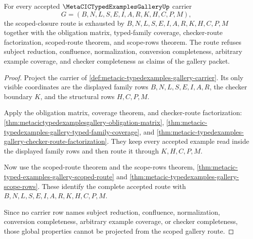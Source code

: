 \begin{theorem}
\label{thm:metacic-typed-examples-gallery-scoped-closure-route}
For every accepted $\MetaCICTypedExamplesGalleryUp$ carrier
$$
G=(B,N,L,S,E,I,A,R,K,H,C,P,M),
$$
the scoped-closure route is exhausted by $B,N,L,S,E,I,A,R,K,H,C,P,M$ together with the obligation matrix, typed-family coverage, checker-route factorization, scoped-route theorem, and scope-rows theorem. The route refuses subject reduction, confluence, normalization, conversion completeness, arbitrary example coverage, and checker completeness as claims of the gallery packet.
\end{theorem}
\begin{proof}
Project the carrier of \autoref{def:metacic-typedexamples-gallery-carrier}. Its only visible coordinates are the displayed family rows $B,N,L,S,E,I,A,R$, the checker boundary $K$, and the structural rows $H,C,P,M$.

Apply the obligation matrix, coverage theorem, and checker-route factorization: \autoref{thm:metacictypedexamplesgallery-obligation-matrix}, \autoref{thm:metacic-typedexamples-gallery-typed-family-coverage}, and \autoref{thm:metacic-typedexamples-gallery-checker-route-factorization}. They keep every accepted example read inside the displayed family rows and then route it through $K,H,C,P,M$.

Now use the scoped-route theorem and the scope-rows theorem, \autoref{thm:metacic-typed-examples-gallery-scoped-route} and \autoref{thm:metacic-typedexamples-gallery-scope-rows}. These identify the complete accepted route with $B,N,L,S,E,I,A,R,K,H,C,P,M$.

Since no carrier row names subject reduction, confluence, normalization, conversion completeness, arbitrary example coverage, or checker completeness, those global properties cannot be projected from the scoped gallery route.
\end{proof}

